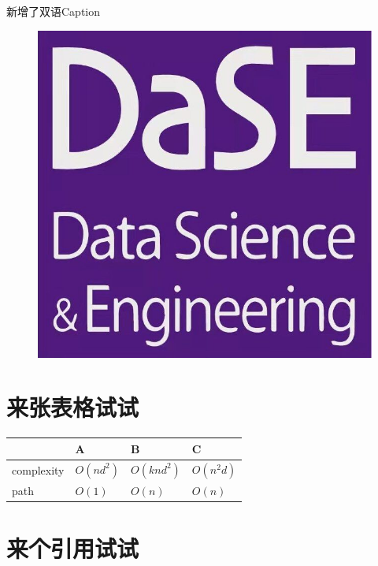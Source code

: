 \documentclass{ecnuthesis}
\begin{document}

新增了双语Caption

\begin{figure}[H]
    \centering
    \includegraphics[scale=0.2]{source/ecnu-dase.jpg}
\end{figure}


\section{来张表格试试}

\begin{table}[h]
\centering
\begin{tabular}{llll} 
  & A & B & C \\
  \hline complexity & $O(nd^{2})$ & $O({knd^{2}})$ & $O(n^{2}d)$ \\
  \hline path & $O(1)$ & $O(n)$ & $O(n)$ \\
\end{tabular}
  \label{tab:my_label}
\end{table}

\section{来个引用试试}
\end{document}
